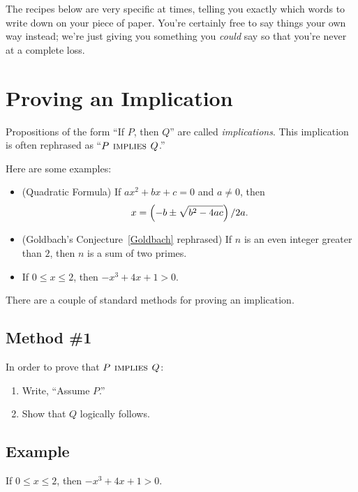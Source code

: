 The recipes below are very specific at times, telling you exactly
which words to write down on your piece of paper.  You're certainly
free to say things your own way instead; we're just giving you
something you \textit{could} say so that you're never at a complete
loss.

\section{Proving an Implication}
\label{sec:prove_implies}

Propositions of the form ``If $P$, then $Q$'' are called%
\emph{implications}.  This implication is often rephrased as ``$P
\mathbin{\mathrm{\textsc{\,implies\,}}} Q$.''

Here are some examples:
%
\begin{itemize}

\item (Quadratic Formula) If $a x^2 + b x + c = 0$ and $a \neq 0$,
then
\[
x = \left(- b \pm \sqrt{b^2 - 4 a c}\right) / 2a.
\]

\item (Goldbach's Conjecture~\ref{Goldbach} rephrased) If $n$ is an
  even integer greater than $2$, then $n$ is a sum of two primes.

\item If $0 \leq x \leq 2$, then $-x^3 + 4x + 1 > 0$.

\end{itemize}
%
There are a couple of standard methods for proving an implication.

\subsection{Method \#1}

In order to prove that $P \mathbin{\mathrm{\textsc{\,implies\,}}} Q$:
%
\begin{enumerate}
\item Write, ``Assume $P$.''
\item Show that $Q$ logically follows.
\end{enumerate}

\subsection*{Example}

\begin{theorem}
If $0 \leq x \leq 2$, then $-x^3 + 4x + 1 > 0$.
\end{theorem}

